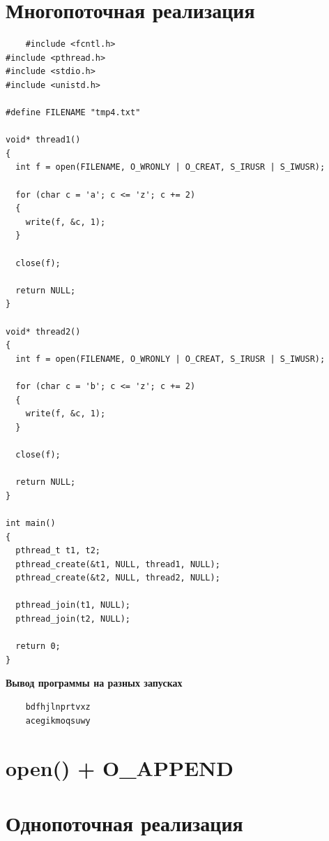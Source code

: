 \section{Многопоточная реализация}

\begin{lstlisting}
	#include <fcntl.h>
#include <pthread.h>
#include <stdio.h>
#include <unistd.h>

#define FILENAME "tmp4.txt"

void* thread1()
{
  int f = open(FILENAME, O_WRONLY | O_CREAT, S_IRUSR | S_IWUSR);

  for (char c = 'a'; c <= 'z'; c += 2)
  {
    write(f, &c, 1);
  }

  close(f);

  return NULL;
}

void* thread2() 
{
  int f = open(FILENAME, O_WRONLY | O_CREAT, S_IRUSR | S_IWUSR);

  for (char c = 'b'; c <= 'z'; c += 2)
  { 
    write(f, &c, 1);
  }

  close(f);

  return NULL;
}

int main()
{
  pthread_t t1, t2;
  pthread_create(&t1, NULL, thread1, NULL);
  pthread_create(&t2, NULL, thread2, NULL);

  pthread_join(t1, NULL);
  pthread_join(t2, NULL);

  return 0;
}
\end{lstlisting}

\textbf{Вывод программы на разных запусках}

\begin{lstlisting}
	bdfhjlnprtvxz
	acegikmoqsuwy
\end{lstlisting}

\section{open() + O\_APPEND}

\section{Однопоточная реализация}


